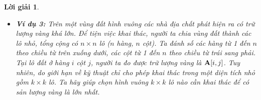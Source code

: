 \documentclass[14pt, a4paper]{article}
\theoremstyle{sltheorem}
\theoremstyle{soltheorem}
\newtheorem*{loigiai}{Lời giải}
\begin{document}
\begin{loigiai}
\begin{itemize} [label={$-$}]
        \begin{equation*}
            1 \times 1 + 2 \times 2 + \dots + N \times N = \dfrac{N (N+1)(2N + 1)}{6} \in O(N^3)
        \end{equation*}

        Độ phức tạp tính toán là $O(N^3)$.

        Đối với chi phí bộ nhớ, ta cần mảng $\bold{C}$ để lưu $N+1$ giá trị thời gian. Mảng trace để lưu $N$ giá trị.
        Vậy độ phức tạp bộ nhớ là $O(N)$.

        Code của thuật toán trên:

        \begin{python}
import numpy as np

N, L = str(input()).split(" ")
N = int(N)
L = int(L)
            
w = []
t = []
            
for _ in range(N):
    x, y = str(input()).split(" ")
    x = int(x)
    y = int(y)
    w.append(x)
    t.append(y)
            
#print(N, L)
#print(w)
#print(t)
            
w = np.array(w)
t = np.array(t)
            
C = [0]
            
trace = []
#bp = 0
for i in range(1, N+1):
    temp_c = np.inf
    split = False
    for k in range(1, i+1):
        if np.sum(w[k-1:i]) <= L:
            if temp_c > C[k-1] + np.max(t[k-1:i]):
                temp_c = C[k-1] + np.max(t[k-1:i])
                split = True
                bp = k
    if split:
        trace.append(bp)
    C.append(temp_c)
            
bps = list(set(trace))
            
print(C[N])
            
for pt in bps:
    print(w[pt - 1], t[pt - 1])
        \end{python}
        
        \item \textbf{Ví dụ 3:} Trên một vùng đất hình vuông các nhà địa chất phát hiện ra có trữ lượng vàng khá lớn.
        Để tiện việc khai thác, người ta chia vùng đất thành các lô nhỏ, tổng cộng có $n \times n$ lô ($n$ hàng, $n$ cột).
        Ta đánh số các hàng từ 1 đến $n$ theo chiều từ trên xuống dưới,
        các cột từ 1 đến $n$ theo chiều từ trái sang phải. Tại lô đất ở hàng $i$ cột $j$,
        người ta đo được trữ lượng vàng là $\bold{A} \lbrack i, j \rbrack$.
        Tuy nhiên, do giới hạn về kỹ thuật chỉ cho phép khai thác trong một diện tích nhỏ gồm $k \times k$ lô.
        Ta hãy giúp chọn hình vuông $k \times k$ lô nào cần khai thác để có sản lượng vàng là lớn nhất.
        

\end{itemize}
\end{loigiai}
\end{document}
